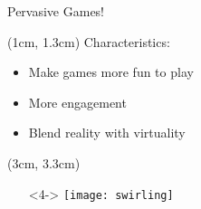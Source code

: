 \begin{frame}{Pervasive Games!}
  
  \begin{textblock*}{10cm}(1cm, 1.3cm)
   Characteristics:
  \begin{itemize}
   \item<1-> Make games more fun to play
   \item<2-> More engagement
   \item<3-> Blend reality with virtuality
  \end{itemize}
  \end{textblock*}

  \begin{textblock*}{5cm}(3cm, 3.3cm)
    \begin{itemize}
     \item[]<4-> \texttt{[image: swirling]}
    \end{itemize}
  \end{textblock*}
\end{frame}
